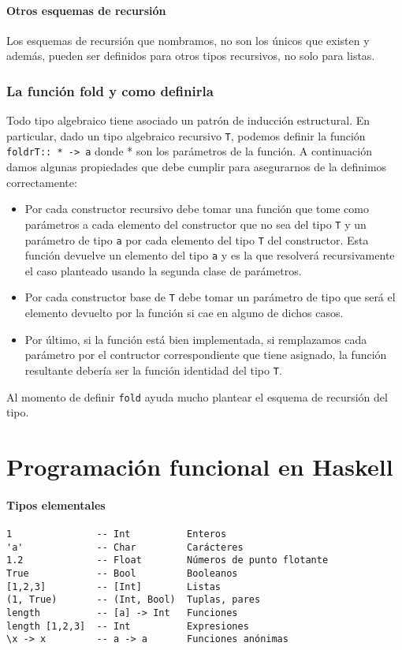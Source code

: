 \documentclass[10pt,a4paper]{article}
\begin{document}
\paragraph{Otros esquemas de recursión} Los esquemas de recursión que nombramos, no son los únicos que existen y además, pueden ser definidos para otros tipos recursivos, no solo para listas.

\subsubsection{La función fold y como definirla}
Todo tipo algebraico tiene asociado un patrón de inducción estructural. En particular, dado un tipo algebraico recursivo \texttt{T}, podemos definir la función \texttt{foldrT:: * -> a} donde * son los parámetros de la función. A continuación damos algunas propiedades que debe cumplir para asegurarnos de la definimos correctamente:
\begin{itemize}
	\item Por cada constructor recursivo debe tomar una función que tome como parámetros a cada elemento del constructor que no sea del tipo \texttt{T} y un parámetro de tipo \texttt{a} por cada elemento del tipo \texttt{T}  del constructor. Esta función devuelve un elemento del tipo \texttt{a} y es la que resolverá recursivamente el caso planteado usando la segunda clase de parámetros.
	\item Por cada constructor base de \texttt{T} debe tomar un parámetro de tipo  que será el elemento devuelto por la función si cae en alguno de dichos casos.
	\item Por último, si la función está bien implementada, si remplazamos cada parámetro por el contructor correspondiente que tiene asignado, la función resultante debería ser la función identidad del tipo \texttt{T}.
\end{itemize}


Al momento de definir \texttt{fold} ayuda mucho plantear el esquema de recursión del tipo.

\appendix

\section{Programación funcional en Haskell}
\paragraph{Tipos elementales}
\begin{centrado}
	\begin{verbatim}
1               -- Int          Enteros
'a'             -- Char         Carácteres
1.2             -- Float        Números de punto flotante
True            -- Bool         Booleanos
[1,2,3]         -- [Int]        Listas
(1, True)       -- (Int, Bool)  Tuplas, pares
length          -- [a] -> Int   Funciones
length [1,2,3]  -- Int          Expresiones
\x -> x         -- a -> a       Funciones anónimas
	\end{verbatim}
\end{centrado}
\end{document}
